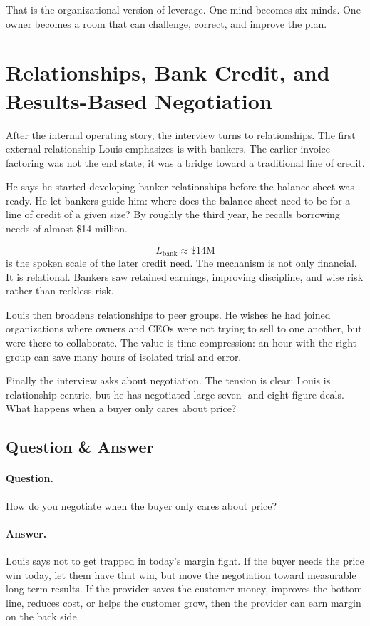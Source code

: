 That is the organizational version of leverage. One mind becomes six minds. One owner becomes a room that can challenge, correct, and improve the plan.

\section{Relationships, Bank Credit, and Results-Based Negotiation}

After the internal operating story, the interview turns to relationships. The first external relationship Louis emphasizes is with bankers. The earlier invoice factoring was not the end state; it was a bridge toward a traditional line of credit.

He says he started developing banker relationships before the balance sheet was ready. He let bankers guide him: where does the balance sheet need to be for a line of credit of a given size? By roughly the third year, he recalls borrowing needs of almost \$14 million.

\begin{equation}
L_{\mathrm{bank}} \approx \$14\text{M}
\end{equation}
is the spoken scale of the later credit need. The mechanism is not only financial. It is relational. Bankers saw retained earnings, improving discipline, and wise risk rather than reckless risk.

Louis then broadens relationships to peer groups. He wishes he had joined organizations where owners and CEOs were not trying to sell to one another, but were there to collaborate. The value is time compression: an hour with the right group can save many hours of isolated trial and error.

Finally the interview asks about negotiation. The tension is clear: Louis is relationship-centric, but he has negotiated large seven- and eight-figure deals. What happens when a buyer only cares about price?

\subsection{Question \& Answer}

\paragraph{Question.} How do you negotiate when the buyer only cares about price?

\paragraph{Answer.} Louis says not to get trapped in today's margin fight. If the buyer needs the price win today, let them have that win, but move the negotiation toward measurable long-term results. If the provider saves the customer money, improves the bottom line, reduces cost, or helps the customer grow, then the provider can earn margin on the back side.

